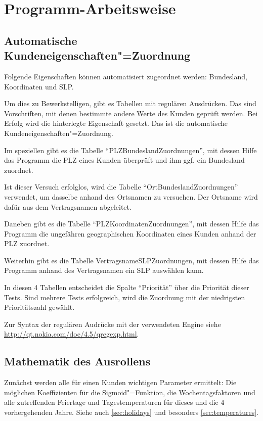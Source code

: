 \chapter{Programm-Arbeitsweise}\label{chap:background}

\section{Automatische Kundeneigenschaften"=Zuordnung}\label{sec:clientautocompletion}

Folgende Eigenschaften können automatisiert zugeordnet werden: Bundesland, Koordinaten und SLP.

Um dies zu Bewerkstelligen, gibt es Tabellen mit regulären Ausdrücken. Das sind Vorschriften, mit denen bestimmte andere Werte des Kunden geprüft werden. Bei Erfolg wird die hinterlegte Eigenschaft gesetzt. Das ist die automatische Kundeneigenschaften"=Zuordnung.

Im speziellen gibt es die Tabelle "`PLZBundeslandZuordnungen"', mit dessen Hilfe das Programm die PLZ eines Kunden überprüft und ihm ggf. ein Bundesland zuordnet.

Ist dieser Versuch erfolglos, wird die Tabelle "`OrtBundeslandZuordnungen"' verwendet, um dasselbe anhand des Ortsnamen zu versuchen. Der Ortsname wird dafür aus dem Vertragsnamen abgeleitet.

Daneben gibt es die Tabelle "`PLZKoordinatenZuordnungen"', mit dessen Hilfe das Programm die ungefähren geographischen Koordinaten eines Kunden anhand der PLZ zuordnet.

Weiterhin gibt es die Tabelle VertragsnameSLPZuordnungen, mit dessen Hilfe das Programm anhand des Vertragsnamen ein SLP auswählen kann.

In diesen 4 Tabellen entscheidet die Spalte "`Priorität"' über die Priorität dieser Tests. Sind mehrere Tests erfolgreich, wird die Zuordnung mit der niedrigsten Prioritätszahl gewählt.

Zur Syntax der regulären Audrücke mit der verwendeten Engine siehe \url{http://qt.nokia.com/doc/4.5/qregexp.html}.

\section{Mathematik des Ausrollens}\label{sec:rollout_mathematics}

Zunächst werden alle für einen Kunden wichtigen Parameter ermittelt: Die möglichen Koeffizienten für die Sigmoid"=Funktion, die Wochentagsfaktoren und alle zutreffenden Feiertage und Tagestemperaturen für dieses und die 4 vorhergehenden Jahre. Siehe auch \vref{sec:holidays} und besonders \vref{sec:temperatures}.

